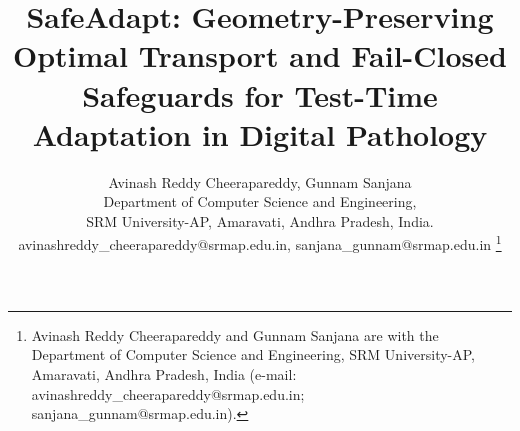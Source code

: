 \documentclass[journal]{IEEEtran}
\begin{document}
\setlength{\textfloatsep}{2.5pt plus 1pt minus 1pt}
\setlength{\floatsep}{2.5pt plus 1pt minus 1pt}
\setlength{\dbltextfloatsep}{2.5pt plus 1pt minus 1pt}
\setlength{\dblfloatsep}{2.5pt plus 1pt minus 1pt}

\title{SafeAdapt: Geometry-Preserving Optimal Transport and Fail-Closed Safeguards for Test-Time Adaptation in Digital Pathology}

\newif\ifblind
\blindfalse

\ifblind
\author{Anonymous~Authors%
\thanks{Manuscript submitted for double-blind peer review.}}
\else
\author{Avinash Reddy Cheerapareddy, Gunnam Sanjana\\
Department of Computer Science and Engineering,\\
SRM University-AP, Amaravati, Andhra Pradesh, India.\\
avinashreddy\_cheerapareddy@srmap.edu.in, sanjana\_gunnam@srmap.edu.in%
\thanks{Avinash Reddy Cheerapareddy and Gunnam Sanjana are with the Department of Computer Science and Engineering, SRM University-AP, Amaravati, Andhra Pradesh, India (e-mail: avinashreddy\_cheerapareddy@srmap.edu.in; sanjana\_gunnam@srmap.edu.in).}}
\fi

\maketitle
\end{document}
